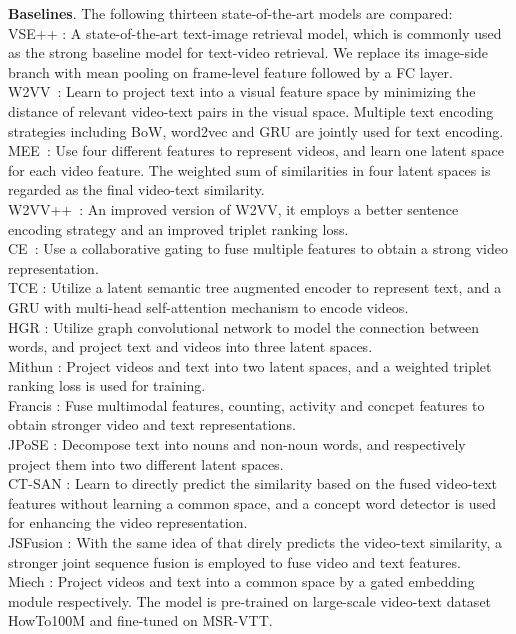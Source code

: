 \textbf{Baselines}. The following thirteen state-of-the-art models are compared:\\
 VSE++ \cite{faghri2017vse}: A state-of-the-art text-image retrieval model, which is commonly used as the strong baseline model for text-video retrieval. We replace its image-side branch with mean pooling on frame-level feature followed by a FC layer. \\ 
 W2VV~\cite{dong2018predicting}: Learn to project text into a visual feature space by minimizing the distance of relevant video-text pairs in the visual space. Multiple text encoding strategies including BoW, word2vec and GRU are jointly used for text encoding.  \\
 MEE~\cite{miech2018learning}: Use four different features to represent videos, and learn one latent space for each video feature. The weighted sum of similarities in four latent spaces is regarded as the final video-text similarity. \\
 W2VV++~\cite{li2019w2vv++}: An improved version of W2VV, it employs a better sentence encoding strategy and an improved triplet ranking loss.  \\
 CE~\cite{liu2019use}: Use a collaborative gating to fuse multiple features to obtain a strong video representation. \\
 TCE \cite{sigir2020tree}: Utilize a latent semantic tree \cite{tai2015improved} augmented encoder to represent text, and a GRU with multi-head self-attention mechanism \cite{vaswani2017attention} to encode videos. \\
 HGR \cite{chen2020fine}: Utilize graph convolutional network to model the connection between words, and project text and videos into three latent spaces. \\
 Mithun \etal \cite{mithun2018learning}: Project videos and text into two latent spaces, and a weighted triplet ranking loss is used for training.  \\
 Francis \etal \cite{iccv2019-francis}: Fuse multimodal features, \ie counting, activity and concpet features to obtain stronger video and text representations. \\
 JPoSE \cite{wray2019fine}: Decompose text into nouns and non-noun words, and respectively project them into two different latent spaces. \\
 CT-SAN \cite{yu2017end}: Learn to directly predict the similarity based on the fused video-text features without learning a common space, and a concept word detector is used for enhancing the video representation.    \\
 JSFusion \cite{yu2018joint}: With the same idea of \cite{yu2017end} that direly predicts the video-text similarity, a stronger joint sequence fusion is employed to fuse video and text features. \\
 Miech \etal \cite{miech2019howto100m}: Project videos and text into a common space by a gated embedding module respectively. The model is pre-trained on large-scale video-text dataset HowTo100M \cite{miech2019howto100m} and fine-tuned on MSR-VTT.

